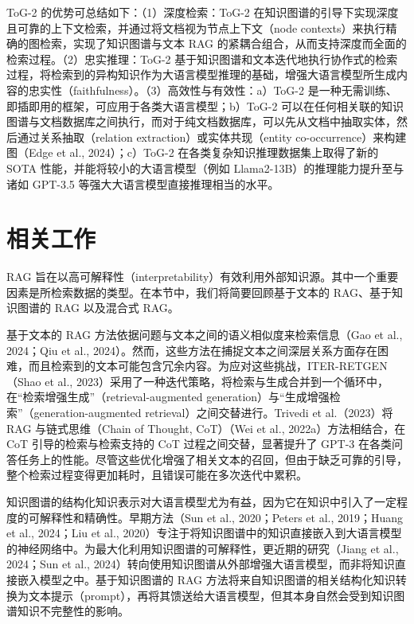 \documentclass[11pt,UTF8,fontset=fandol]{ctexart}
\newcommand{\toctwo}{ToG-2}
\begin{document}
\toctwo{} 的优势可总结如下：（1）深度检索：\toctwo{} 在知识图谱的引导下实现深度且可靠的上下文检索，并通过将文档视为节点上下文（node contexts）来执行精确的图检索，实现了知识图谱与文本 RAG 的紧耦合组合，从而支持深度而全面的检索过程。（2）忠实推理：\toctwo{} 基于知识图谱和文本迭代地执行协作式的检索过程，将检索到的异构知识作为大语言模型推理的基础，增强大语言模型所生成内容的忠实性（faithfulness）。（3）高效性与有效性：a）\toctwo{} 是一种无需训练、即插即用的框架，可应用于各类大语言模型；b）\toctwo{} 可以在任何相关联的知识图谱与文档数据库之间执行，而对于纯文档数据库，可以先从文档中抽取实体，然后通过关系抽取（relation extraction）或实体共现（entity co-occurrence）来构建图（Edge et al., 2024）；c）\toctwo{} 在各类复杂知识推理数据集上取得了新的 SOTA 性能，并能将较小的大语言模型（例如 Llama2-13B）的推理能力提升至与诸如 GPT-3.5 等强大大语言模型直接推理相当的水平。

\section{相关工作}

RAG 旨在以高可解释性（interpretability）有效利用外部知识源。其中一个重要因素是所检索数据的类型。在本节中，我们将简要回顾基于文本的 RAG、基于知识图谱的 RAG 以及混合式 RAG。

基于文本的 RAG 方法依据问题与文本之间的语义相似度来检索信息（Gao et al., 2024；Qiu et al., 2024）。然而，这些方法在捕捉文本之间深层关系方面存在困难，而且检索到的文本可能包含冗余内容。为应对这些挑战，ITER-RETGEN（Shao et al., 2023）采用了一种迭代策略，将检索与生成合并到一个循环中，在“检索增强生成”（retrieval-augmented generation）与“生成增强检索”（generation-augmented retrieval）之间交替进行。Trivedi et al.（2023）将 RAG 与链式思维（Chain of Thought, CoT）（Wei et al., 2022a）方法相结合，在 CoT 引导的检索与检索支持的 CoT 过程之间交替，显著提升了 GPT-3 在各类问答任务上的性能。尽管这些优化增强了相关文本的召回，但由于缺乏可靠的引导，整个检索过程变得更加耗时，且错误可能在多次迭代中累积。

知识图谱的结构化知识表示对大语言模型尤为有益，因为它在知识中引入了一定程度的可解释性和精确性。早期方法（Sun et al., 2020；Peters et al., 2019；Huang et al., 2024；Liu et al., 2020）专注于将知识图谱中的知识直接嵌入到大语言模型的神经网络中。为最大化利用知识图谱的可解释性，更近期的研究（Jiang et al., 2024；Sun et al., 2024）转向使用知识图谱从外部增强大语言模型，而非将知识直接嵌入模型之中。基于知识图谱的 RAG 方法将来自知识图谱的相关结构化知识转换为文本提示（prompt），再将其馈送给大语言模型，但其本身自然会受到知识图谱知识不完整性的影响。
\end{document}

